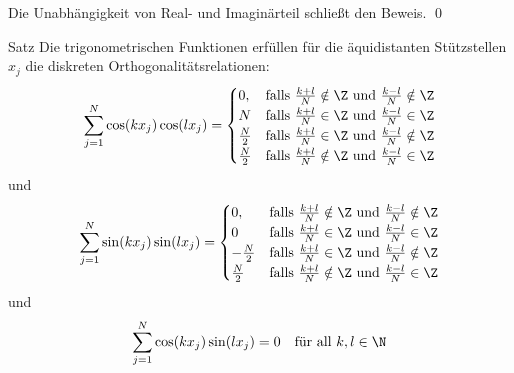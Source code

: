 Die Unabhängigkeit von Real- und Imaginärteil schließt den Beweis.
\qed

\begin{colbox}{Satz}
  Die trigonometrischen Funktionen erfüllen für die äquidistanten Stützstellen $x_j$ 
  die diskreten Orthogonalitätsrelationen:
  \begin{align*}
    \sum_{j=1}^{N} \cos(kx_j)\cos(lx_j) = \begin{cases}
      0, &\text{falls } \tfrac{k+l}{N}\notin \Z \text{ und } \tfrac{k-l}{N}\notin \Z \\
      N &\text{falls } \tfrac{k+l}{N}\in \Z \text{ und } \tfrac{k-l}{N}\in \Z \\
      \tfrac{N}{2} &\text{falls } \tfrac{k+l}{N}\in \Z \text{ und } \tfrac{k-l}{N}\notin \Z \\
      \tfrac{N}{2} &\text{falls } \tfrac{k+l}{N}\notin \Z \text{ und } \tfrac{k-l}{N}\in \Z
    \end{cases}
  \end{align*}
  und 
  \begin{align*}
    \sum_{j=1}^{N} \sin(kx_j)\sin(lx_j) = \begin{cases}
      0, &\text{falls } \tfrac{k+l}{N}\notin \Z \text{ und } \tfrac{k-l}{N}\notin \Z \\
      0 &\text{falls } \tfrac{k+l}{N}\in \Z \text{ und } \tfrac{k-l}{N}\in \Z \\
      -\tfrac{N}{2} &\text{falls } \tfrac{k+l}{N}\in \Z \text{ und } \tfrac{k-l}{N}\notin \Z \\
      \tfrac{N}{2} &\text{falls } \tfrac{k+l}{N}\notin \Z \text{ und } \tfrac{k-l}{N}\in \Z
    \end{cases}
  \end{align*}
  und 
  \begin{align*}
    \sum_{j=1}^{N} \cos(kx_j)\sin(lx_j) = 0 \quad \text{für all } k,l\in\N
  \end{align*}
\end{colbox}

